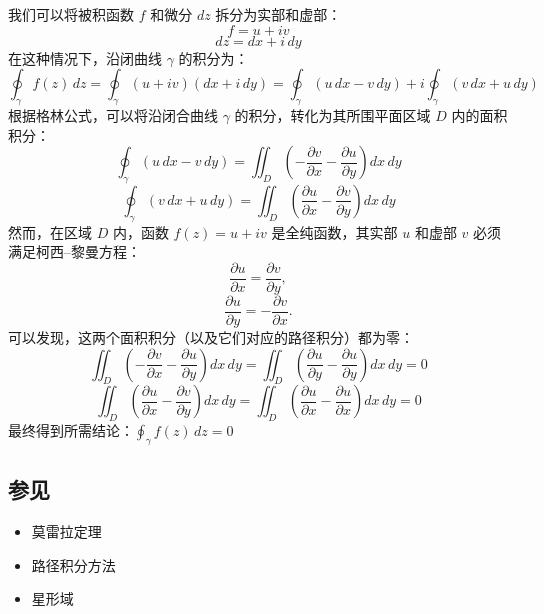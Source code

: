 我们可以将被积函数 $f$ 和微分 $dz$ 拆分为实部和虚部：
$$
f = u + iv~
$$
$$
dz = dx + i\,dy~
$$
在这种情况下，沿闭曲线 $\gamma$ 的积分为：
$$
\oint_{\gamma} f(z)\,dz
= \oint_{\gamma} (u + iv)(dx + i\,dy)
= \oint_{\gamma} (u\,dx - v\,dy)
+ i \oint_{\gamma} (v\,dx + u\,dy)~
$$
根据格林公式，可以将沿闭合曲线 $\gamma$ 的积分，转化为其所围平面区域 $D$ 内的面积积分：
$$
\oint_{\gamma} (u\,dx - v\,dy)
= \iint_{D} 
\left(
-\frac{\partial v}{\partial x} 
-\frac{\partial u}{\partial y}
\right)
dx\,dy~
$$
$$
\oint_{\gamma} (v\,dx + u\,dy)
= \iint_{D} 
\left(
\frac{\partial u}{\partial x} 
-\frac{\partial v}{\partial y}
\right)
dx\,dy~
$$
然而，在区域 $D$ 内，函数 $f(z) = u + iv$ 是全纯函数，其实部 $u$ 和虚部 $v$ 必须满足柯西–黎曼方程：
$$
\frac{\partial u}{\partial x} = \frac{\partial v}{\partial y},~
$$
$$
\frac{\partial u}{\partial y} = -\frac{\partial v}{\partial x}.~
$$
可以发现，这两个面积积分（以及它们对应的路径积分）都为零：
$$
\iint_{D}
\left(
-\frac{\partial v}{\partial x}
-\frac{\partial u}{\partial y}
\right)
dx\,dy
=
\iint_{D}
\left(
\frac{\partial u}{\partial y}
-\frac{\partial u}{\partial y}
\right)
dx\,dy
= 0~
$$
$$
\iint_{D}
\left(
\frac{\partial u}{\partial x}
-\frac{\partial v}{\partial y}
\right)
dx\,dy
=
\iint_{D}
\left(
\frac{\partial u}{\partial x}
-\frac{\partial u}{\partial x}
\right)
dx\,dy
= 0~
$$
最终得到所需结论：$\oint_{\gamma} f(z)\,dz = 0$
\subsection{参见}
\begin{itemize}
\item 莫雷拉定理
\item 路径积分方法
\item 星形域
\end{itemize}
